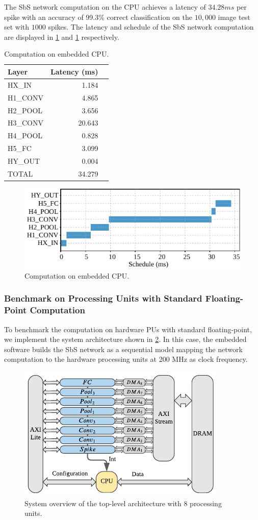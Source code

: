 The SbS network computation on the CPU achieves a latency of $34.28 ms$ per spike with an accuracy of 99.3\% correct classification on the $10,000$ image test set with $1000$ spikes. The latency and schedule of the SbS network computation are displayed in \ref{tab:latency_sw} and \ref{fig:latency_sw} respectively.

\begin{table}[!t]\centering
	\caption{Computation on embedded CPU.}\label{tab:latency_sw}
	\scriptsize
\begin{tabular}{lrr}\toprule
	\textbf{Layer} &\textbf{Latency (ms)} \\\midrule
	HX\_IN &1.184 \\
	H1\_CONV &4.865 \\
	H2\_POOL &3.656 \\
	H3\_CONV &20.643 \\
	H4\_POOL &0.828 \\
	H5\_FC &3.099 \\
	HY\_OUT &0.004 \\
		
	TOTAL &34.279 \\
	\bottomrule
\end{tabular}
\end{table}

\begin{figure}[b!]
	\centering
	\includegraphics[width=0.5\columnwidth]{./chapters/sbs_accelerator/figures/latency_sw.pdf}
	\caption{Computation on embedded CPU.}
	\label{fig:latency_sw}
\end{figure}

\subsubsection{Benchmark on Processing Units with Standard Floating-Point Computation}
To benchmark the computation on hardware PUs with standard floating-point, we implement the system architecture shown in \ref{fig:hw_sbs_8_pu}. In this case, the embedded software builds the SbS network as a sequential model mapping the network computation to the hardware processing units at 200 MHz as clock frequency.

\begin{figure}[b!]
	\centering
	\includegraphics[width=0.5\columnwidth]{./chapters/sbs_accelerator/figures/sbs_hw_experimental.pdf}
	\caption{System overview of the top-level architecture with 8 processing units.}
	\label{fig:hw_sbs_8_pu}
\end{figure}

